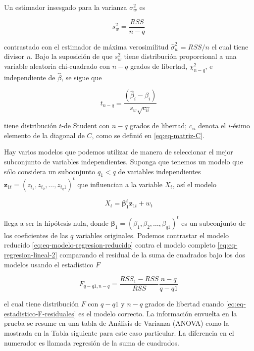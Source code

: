 \documentclass[12pt,]{krantz}
\theoremstyle{definition}
\theoremstyle{definition}
\theoremstyle{definition}
\theoremstyle{remark}
\begin{document}
Un estimador insesgado para la varianza \(\sigma_w^2\) es

\begin{equation}
s_w^2=\frac{RSS}{n-q}
\label{eq:eq-estimador-insesgado-varianza}
\end{equation}

contrastado con el estimador de máxima verosimilitud
\(\hat{\sigma}_w^2=RSS/n\) el cual tiene divisor \(n\). Bajo la
suposición de que \(s_w^2\) tiene distribución proporcional a una
variable aleatoria chi-cuadrado con \(n-q\) grados de libertad,
\(\chi_{n-q}^2\), e independiente de \(\hat{\beta}\), se sigue que

\begin{equation}
t_{n-q}=\frac{(\hat{\beta}_i-\beta_i)}{s_w\sqrt{c_{ii}}}
\label{eq:eq-estadistico-t}
\end{equation}

tiene distribución \(t\)-de Student con \(n-q\) grados de libertad;
\(c_{ii}\) denota el \(i\)-ésimo elemento de la diagonal de \(C\), como
se definió en \eqref{eq:eq-matriz-C}.

Hay varios modelos que podemos utilizar de manera de seleccionar el
mejor subconjunto de variables independientes. Suponga que tenemos un
modelo que sólo considera un subconjunto \(q_1<q\) de variables
independientes \(\mathbf{z}_{1t}=(z_{t_1},z_{t_2},\ldots,z_{t_q1})^t\)
que influencian a la variable \(X_t\), así el modelo

\begin{equation}
X_t=\mathbf{\beta}_1^t\mathbf{z}_{1t}+w_t
\label{eq:eq-modelo-regresion-reducido}
\end{equation}

llega a ser la hipótesis nula, donde
\(\mathbf{\beta}_1=(\beta_1,\beta_2,\ldots,\beta_{q1})^t\) es un
subconjunto de los coeficientes de las \(q\) variables originales.
Podemos contrastar el modelo reducido
\eqref{eq:eq-modelo-regresion-reducido} contra el modelo completo
\eqref{eq:eq-regresion-lineal-2} comparando el residual de la suma de
cuadrados bajo los dos modelos usando el estadístico \(F\)

\begin{equation}
F_{q-q1,n-q}=\frac{RSS_1-RSS}{RSS}\frac{n-q}{q-q1}
\label{eq:eq-estadistico-F-residuales}
\end{equation}

el cual tiene distribución \(F\) con \(q-q1\) y \(n-q\) grados de
libertad cuando \eqref{eq:eq-estadistico-F-residuales} es el modelo
correcto. La información envuelta en la prueba se resume en una tabla de
Análisis de Varianza (ANOVA) como la mostrada en la Tabla siguiente para
este caso particular. La diferencia en el numerador es llamada regresión
de la suma de cuadrados.
\end{document}
